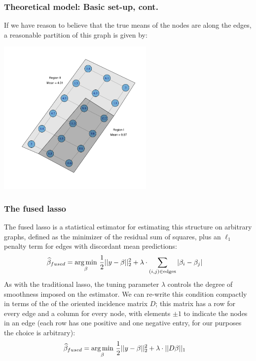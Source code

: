 \begin{frame}
  \frametitle{Theoretical model: Basic set-up, cont.}
  \small

  If we have reason to believe that the true means of the nodes are
  along the edges, a reasonable partition of this graph is given by:

  \vspace{-0.3in}

  \begin{center}
  \includegraphics[height=3in]{img/graph_region}
  \end{center}

\end{frame}

\begin{frame}
  \frametitle{The fused lasso}
  \footnotesize

  The fused lasso is a statistical estimator for estimating this structure on arbitrary graphs,
  defined as the minimizer of the residual sum of squares, plus an $\ell_1$ penalty term for edges
  with discordant mean predictions:
  \begin{align}
    \widehat{\beta}_{fused} &= \mathop{\mathrm{arg\,min}}_{\beta} \, \frac{1}{2}|| y - \beta ||_2^2 +
          \lambda \cdot \sum_{(i,j) \in \text{edges}} | \beta_i - \beta_j |
  \end{align}
  \pause As with the traditional lasso, the tuning parameter $\lambda$ controls the degree of smoothness
  imposed on the estimator. We can re-write this condition compactly in terms of the of the oriented
  incidence matrix $D$; this matrix has a row for every edge and a column for every node, with
  elements $\pm1$ to indicate the nodes in an edge (each row has one positive and one negative
  entry, for our purposes the choice is arbitrary):
  \begin{align}
    \widehat{\beta}_{fused} &= \mathop{\mathrm{arg\,min}}_{\beta} \, \frac{1}{2}|| y - \beta ||_2^2 +
           \lambda \cdot || D \beta ||_1
  \end{align}


\end{frame}

